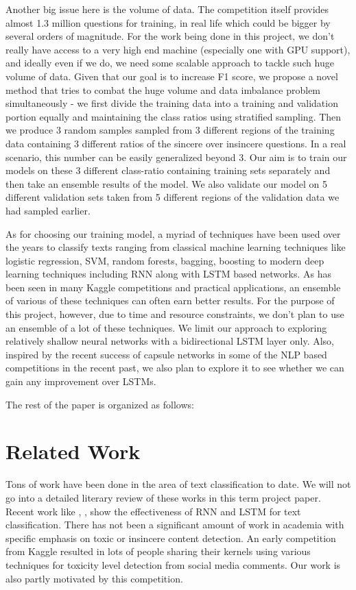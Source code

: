 \documentclass[11pt,twocolumn,letterpaper]{article}
\begin{document}
Another big issue here is the volume of data. The competition itself provides almost 1.3 million questions for training, in real life which could be bigger by several orders of magnitude. For the work being done in this project, we don't really have access to a very high end machine (especially one with GPU support), and ideally even if we do, we need some scalable approach to tackle such huge volume of data. Given that our goal is to increase F1 score, we propose a novel method that tries to combat the huge volume and data imbalance problem simultaneously - we first divide the training data into a training and validation portion equally and maintaining the class ratios using stratified sampling. Then we produce 3 random samples sampled from 3 different regions of the training data containing 3 different ratios of the sincere over insincere questions. In a real scenario, this number can be easily generalized beyond 3. Our aim is to train our models on these 3 different class-ratio containing training sets separately and then take an ensemble results of the model. We also validate our model on 5 different validation sets taken from 5 different regions of the validation data we had sampled earlier. 

As for choosing our training model, a myriad of techniques have been used over the years to classify texts ranging from classical machine learning techniques like logistic regression, SVM, random forests, bagging, boosting to modern deep learning techniques including RNN \cite{rnn1} along with LSTM \cite{lstm1} based networks. As has been seen in many Kaggle competitions and practical applications, an ensemble of various of these techniques can often earn better results. For the purpose of this project, however, due to time and resource constraints, we don't plan to use an ensemble of a lot of these  techniques. We limit our approach to exploring relatively shallow neural networks with a bidirectional LSTM layer only. Also, inspired by the recent success of capsule networks \cite{capsule1} in some of the NLP based competitions in the recent past, we also plan to explore it to see whether we can gain any improvement over LSTMs. 

The rest of the paper is organized as follows: 

\section{Related Work}
Tons of work have been done in the area of text classification to date. We will not go into a detailed literary review of these works in this term project paper. Recent work like \cite{text1}, \cite{text2}, \cite{text3} show the effectiveness of RNN and LSTM for text classification. There has not been a significant amount of work in academia with specific emphasis on toxic or insincere content detection. An early competition from Kaggle \cite{Kaggle2} resulted in lots of people sharing their kernels using various techniques for toxicity level detection from social media comments. Our work is also partly motivated by this competition.
\end{document}
